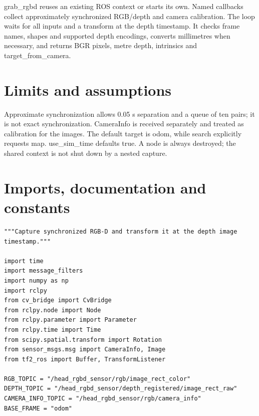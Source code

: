 \documentclass[11pt,a4paper]{book}
\begin{document}
grab\_rgbd reuses an existing ROS context or starts its own. Named callbacks collect approximately synchronized RGB/depth and camera calibration. The loop waits for all inputs and a transform at the depth timestamp. It checks frame names, shapes and supported depth encodings, converts millimetres when necessary, and returns BGR pixels, metre depth, intrinsics and target\_from\_camera.

\section*{Limits and assumptions}

Approximate synchronization allows 0.05 s separation and a queue of ten pairs; it is not exact synchronization. CameraInfo is received separately and treated as calibration for the images. The default target is odom, while search explicitly requests map. use\_sim\_time defaults true. A node is always destroyed; the shared context is not shut down by a nested capture.

\section{Imports, documentation and constants}

\begin{lstlisting}[firstnumber=1]
"""Capture synchronized RGB-D and transform it at the depth image timestamp."""

import time
import message_filters
import numpy as np
import rclpy
from cv_bridge import CvBridge
from rclpy.node import Node
from rclpy.parameter import Parameter
from rclpy.time import Time
from scipy.spatial.transform import Rotation
from sensor_msgs.msg import CameraInfo, Image
from tf2_ros import Buffer, TransformListener

RGB_TOPIC = "/head_rgbd_sensor/rgb/image_rect_color"
DEPTH_TOPIC = "/head_rgbd_sensor/depth_registered/image_rect_raw"
CAMERA_INFO_TOPIC = "/head_rgbd_sensor/rgb/camera_info"
BASE_FRAME = "odom"


\end{lstlisting}
\end{document}
